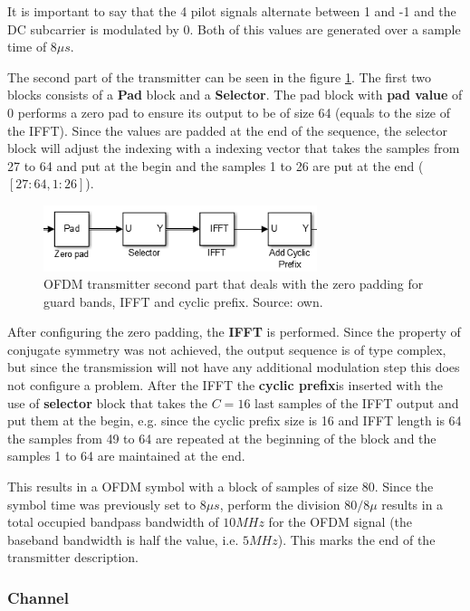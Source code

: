 It is important to say that the 4 pilot signals alternate between 1 and -1 and the DC subcarrier is modulated by 0. Both of this values are generated over a sample time of $8 \mu s$.

The second part of the transmitter can be seen in the figure \ref{fig:ofdm:2}. The first two blocks consists of a \textbf{Pad} block and a \textbf{Selector}. The pad block with \textbf{pad value} of 0 performs a zero pad to ensure its output to be of size 64 (equals to the size of the IFFT). Since the values are padded at the end of the sequence, the selector block will adjust the indexing with a indexing vector that takes the samples from 27 to 64 and put at the begin and the samples 1 to 26 are put at the end ($[27:64, 1:26]$).

\begin{figure}[h]
\begin{center}
\includegraphics[width=8cm]{images/TX2.png}
\caption{OFDM transmitter second part that deals with the zero padding for guard bands, IFFT and cyclic prefix. Source: own.}
\label{fig:ofdm:2} 
\end{center}
\end{figure}

After configuring the zero padding, the \textbf{IFFT} is performed. Since the property of conjugate symmetry was not achieved, the output sequence is of type complex, but since the transmission will not have any additional modulation step this does not configure a problem. After the IFFT the \textbf{cyclic prefix}is inserted with the use of \textbf{selector} block that takes the $C=16$ last samples of the IFFT output and put them at the begin, e.g. since the cyclic prefix size is 16 and IFFT length is 64 the samples from 49 to 64 are repeated at the beginning of the block and the samples 1 to 64 are maintained at the end. 

This results in a OFDM symbol with a block of samples of size 80. Since the symbol time was previously set to $8\mu s$, perform the division $80/8 \mu$ results in a total occupied bandpass bandwidth of $10 MHz$ for the OFDM signal (the baseband bandwidth is half the value, i.e. $5 MHz$). This marks the end of the transmitter description.

\subsubsection{Channel}

